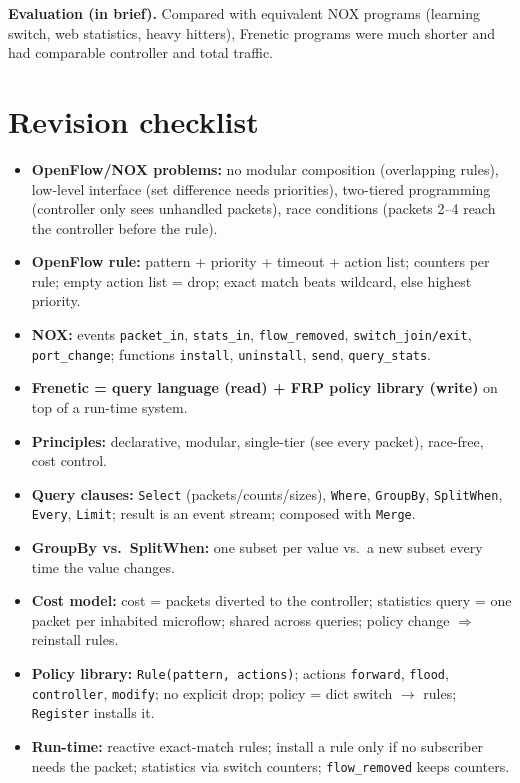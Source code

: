 \textbf{Evaluation (in brief).} Compared with equivalent NOX programs (learning switch, web statistics, heavy hitters), Frenetic programs were much shorter and had comparable controller and total traffic.

\section{Revision checklist}
\begin{itemize}
\item \textbf{OpenFlow/NOX problems:} no modular composition (overlapping rules), low-level interface (set difference needs priorities), two-tiered programming (controller only sees unhandled packets), race conditions (packets 2--4 reach the controller before the rule).
\item \textbf{OpenFlow rule:} pattern + priority + timeout + action list; counters per rule; empty action list = drop; exact match beats wildcard, else highest priority.
\item \textbf{NOX:} events \texttt{packet\_in}, \texttt{stats\_in}, \texttt{flow\_removed}, \texttt{switch\_join/exit}, \texttt{port\_change}; functions \texttt{install}, \texttt{uninstall}, \texttt{send}, \texttt{query\_stats}.
\item \textbf{Frenetic = query language (read) + FRP policy library (write)} on top of a run-time system.
\item \textbf{Principles:} declarative, modular, single-tier (see every packet), race-free, cost control.
\item \textbf{Query clauses:} \texttt{Select} (packets/counts/sizes), \texttt{Where}, \texttt{GroupBy}, \texttt{SplitWhen}, \texttt{Every}, \texttt{Limit}; result is an event stream; composed with \texttt{Merge}.
\item \textbf{GroupBy vs.\ SplitWhen:} one subset per value vs.\ a new subset every time the value changes.
\item \textbf{Cost model:} cost = packets diverted to the controller; statistics query = one packet per inhabited microflow; shared across queries; policy change $\Rightarrow$ reinstall rules.
\item \textbf{Policy library:} \texttt{Rule(pattern, actions)}; actions \texttt{forward}, \texttt{flood}, \texttt{controller}, \texttt{modify}; no explicit drop; policy = dict switch $\to$ rules; \texttt{Register} installs it.
\item \textbf{Run-time:} reactive exact-match rules; install a rule only if no subscriber needs the packet; statistics via switch counters; \texttt{flow\_removed} keeps counters.
\end{itemize}
